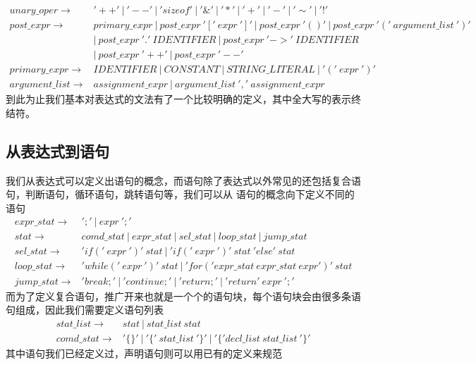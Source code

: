 \documentclass[UTF8]{ctexart}
\begin{document}
\begin{align*}
    unary\_oper\to & '++'\ |\ '--'\ |\ 'sizeof'\ |\ '\&'\ |\ '*'\ |\ '+'\ |\ '-'\ |\ '\sim'\ |\ '!'\\
    post\_expr\to & primary\_expr\ |\ post\_expr\ '['\ expr\ ']'\ |\ post\_expr\ '()'\ |\ post\_expr\ '('\ argument\_list\ ')'\\
    & |\ post\_expr\ '.'\ IDENTIFIER\ |\ post\_expr\ '->'\ IDENTIFIER\\
    & |\ post\_expr\ '++'\ |\ post\_expr\ '--'\\
    primary\_expr\to & IDENTIFIER\ |\ CONSTANT\ |\ STRING\_LITERAL\ |\ '('\ expr\ ')'\\
    argument\_list\to & assignment\_expr\ |\ argument\_list\ ','\ assignment\_expr
\end{align*}
到此为止我们基本对表达式的文法有了一个比较明确的定义，其中全大写的表示终结符。
\subsection{从表达式到语句}
我们从表达式可以定义出语句的概念，而语句除了表达式以外常见的还包括复合语句，判断语句，循环语句，跳转语句等，我们可以从
语句的概念向下定义不同的语句
\begin{align*}
    expr\_stat\to & ';'\ |\ expr\ ';'\ \\
    stat\to & comd\_stat\ |\ expr\_stat\ |\ sel\_stat\ |\ loop\_stat\ |\ jump\_stat\\
    sel\_stat\to & 'if('\ expr\ ')'\ stat\ |\ 'if('\ expr\ ')'\ stat\ 'else'\ stat\\
    loop\_stat\to & 'while('\ expr\ ')'\ stat\ |\ 'for('expr\_stat\ expr\_stat\ expr')'\ stat\\
    jump\_stat\to & 'break;'\ |\ 'continue;'\ |\ 'return;'\ |\ 'return'\ expr\ ';'
\end{align*}
而为了定义复合语句，推广开来也就是一个个的语句块，每个语句块会由很多条语句组成，因此我们需要定义语句列表
\begin{align*}
    stat\_list\to & stat\ |\ stat\_list\ stat\\
    comd\_stat\to & '\{\}'\ |\ '\{'\ stat\_list\ '\}'\ |\ '\{'decl\_list\ stat\_list\ '\}'
\end{align*}
其中语句我们已经定义过，声明语句则可以用已有的定义来规范
\end{document}
